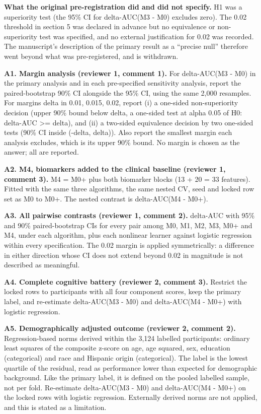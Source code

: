 \documentclass[11pt]{article}
\begin{document}
\textbf{What the original pre-registration did and did not specify.} H1 was a superiority test (the 95\% CI for delta-AUC(M3 - M0) excludes zero). The 0.02 threshold in section 5 was declared in advance but no equivalence or non-superiority test was specified, and no external justification for 0.02 was recorded. The manuscript's description of the primary result as a ``precise null'' therefore went beyond what was pre-registered, and is withdrawn.

\textbf{A1. Margin analysis (reviewer 1, comment 1).} For delta-AUC(M3 - M0) in the primary analysis and in each pre-specified sensitivity analysis, report the paired-bootstrap 90\% CI alongside the 95\% CI, using the same 2,000 resamples. For margins delta in {0.01, 0.015, 0.02}, report (i) a one-sided non-superiority decision (upper 90\% bound below delta, a one-sided test at alpha 0.05 of H0: delta-AUC >= delta), and (ii) a two-sided equivalence decision by two one-sided tests (90\% CI inside (-delta, delta)). Also report the smallest margin each analysis excludes, which is its upper 90\% bound. No margin is chosen as the answer; all are reported.

\textbf{A2. M4, biomarkers added to the clinical baseline (reviewer 1, comment 3).} M4 = M0+ plus both biomarker blocks (13 + 20 = 33 features). Fitted with the same three algorithms, the same nested CV, seed and locked row set as M0 to M0+. The nested contrast is delta-AUC(M4 - M0+).

\textbf{A3. All pairwise contrasts (reviewer 1, comment 2).} delta-AUC with 95\% and 90\% paired-bootstrap CIs for every pair among M0, M1, M2, M3, M0+ and M4, under each algorithm, plus each nonlinear learner against logistic regression within every specification. The 0.02 margin is applied symmetrically: a difference in either direction whose CI does not extend beyond 0.02 in magnitude is not described as meaningful.

\textbf{A4. Complete cognitive battery (reviewer 2, comment 3).} Restrict the locked rows to participants with all four component scores, keep the primary label, and re-estimate delta-AUC(M3 - M0) and delta-AUC(M4 - M0+) with logistic regression.

\textbf{A5. Demographically adjusted outcome (reviewer 2, comment 2).} Regression-based norms derived within the 3,124 labelled participants: ordinary least squares of the composite z-score on age, age squared, sex, education (categorical) and race and Hispanic origin (categorical). The label is the lowest quartile of the residual, read as performance lower than expected for demographic background. Like the primary label, it is defined on the pooled labelled sample, not per fold. Re-estimate delta-AUC(M3 - M0) and delta-AUC(M4 - M0+) on the locked rows with logistic regression. Externally derived norms are not applied, and this is stated as a limitation.
\end{document}

